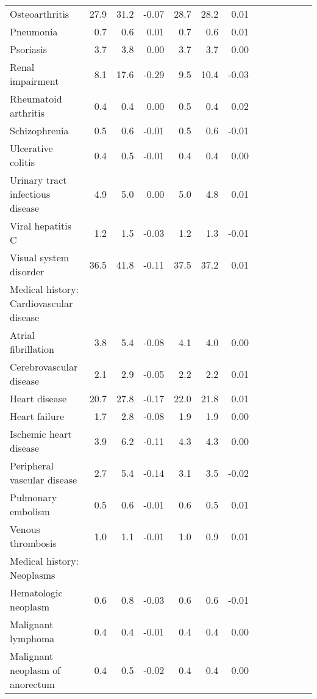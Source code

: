 \documentclass[11pt,]{article}
\begin{document}
\begin{longtable}{lrrrrrrrrrrrr}
      Osteoarthritis & 27.9 & 31.2 & -0.07 & 28.7 & 28.2 &  0.01 \\ 
      Pneumonia &  0.7 &  0.6 &  0.01 &  0.7 &  0.6 &  0.01 \\ 
      Psoriasis &  3.7 &  3.8 &  0.00 &  3.7 &  3.7 &  0.00 \\ 
      Renal impairment &  8.1 & 17.6 & -0.29 &  9.5 & 10.4 & -0.03 \\ 
      Rheumatoid arthritis &  0.4 &  0.4 &  0.00 &  0.5 &  0.4 &  0.02 \\ 
      Schizophrenia &  0.5 &  0.6 & -0.01 &  0.5 &  0.6 & -0.01 \\ 
      Ulcerative colitis &  0.4 &  0.5 & -0.01 &  0.4 &  0.4 &  0.00 \\ 
      Urinary tract infectious disease &  4.9 &  5.0 &  0.00 &  5.0 &  4.8 &  0.01 \\ 
      Viral hepatitis C &  1.2 &  1.5 & -0.03 &  1.2 &  1.3 & -0.01 \\ 
      Visual system disorder & 36.5 & 41.8 & -0.11 & 37.5 & 37.2 &  0.01 \\ 
  Medical history: Cardiovascular disease &    &    &     &    &    &     \\ 
      Atrial fibrillation &  3.8 &  5.4 & -0.08 &  4.1 &  4.0 &  0.00 \\ 
      Cerebrovascular disease &  2.1 &  2.9 & -0.05 &  2.2 &  2.2 &  0.01 \\ 
      Heart disease & 20.7 & 27.8 & -0.17 & 22.0 & 21.8 &  0.01 \\ 
      Heart failure &  1.7 &  2.8 & -0.08 &  1.9 &  1.9 &  0.00 \\ 
      Ischemic heart disease &  3.9 &  6.2 & -0.11 &  4.3 &  4.3 &  0.00 \\ 
      Peripheral vascular disease &  2.7 &  5.4 & -0.14 &  3.1 &  3.5 & -0.02 \\ 
      Pulmonary embolism &  0.5 &  0.6 & -0.01 &  0.6 &  0.5 &  0.01 \\ 
      Venous thrombosis &  1.0 &  1.1 & -0.01 &  1.0 &  0.9 &  0.01 \\ 
  Medical history: Neoplasms &    &    &     &    &    &     \\ 
      Hematologic neoplasm &  0.6 &  0.8 & -0.03 &  0.6 &  0.6 & -0.01 \\ 
      Malignant lymphoma &  0.4 &  0.4 & -0.01 &  0.4 &  0.4 &  0.00 \\ 
      Malignant neoplasm of anorectum &  0.4 &  0.5 & -0.02 &  0.4 &  0.4 &  0.00 \\ 

\end{longtable}
\end{document}
